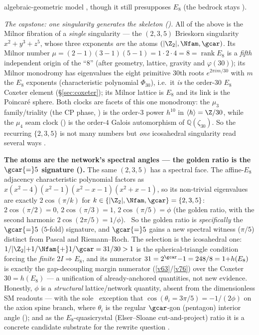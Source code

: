 \begin{keybox}
algebraic-geometric model \mC, though it still presupposes $E_8$ (the bedrock stays \mO).
\par\smallskip\noindent\emph{The capstone: one singularity generates the skeleton
().} All of the above is the Milnor fibration of a \emph{single}
singularity --- the $(2,3,5)$ Brieskorn singularity $x^2+y^3+z^5$, whose three exponents \emph{are} the atoms
$(|\Z_2|,\Nfam,\gcar)$. Its Milnor number $\mu=(2{-}1)(3{-}1)(5{-}1)=1{\cdot}2{\cdot}4=8=\operatorname{rank}E_8$
is a \emph{fifth} independent origin of the ``$8$'' (after geometry, lattice, gravity and $\varphi(30)$);
its Milnor monodromy has eigenvalues the eight primitive $30$th roots $e^{2\pi i m/30}$ with $m$ the $E_8$
exponents (characteristic polynomial $\Phi_{30}$), i.e.\ it \emph{is} the order-$30$ $E_8$ Coxeter element
(\S\ref{sec:coxeter}); its Milnor lattice is $E_8$ and its link is the Poincar\'e sphere. Both clocks are
facets of this one monodromy: the $\mu_3$ family/triality (the CP phase, )
is the order-$3$ power $h^{10}$ in $\langle h\rangle=\Z/30$, while the $\mu_4$ seam clock
() is the order-$4$ Galois automorphism of $\mathbb Q(\zeta_{30})$. So the
recurring $\{2,3,5\}$ is not many numbers but \emph{one} icosahedral singularity read several ways \mE.
\end{keybox}

\par\smallskip\noindent\textbf{The atoms are the network's spectral angles --- the golden ratio is the
$\gcar{=}5$ signature ().} The same $(2,3,5)$ has a spectral face. The
affine-$E_8$ adjacency characteristic polynomial factors as $x(x^2{-}4)(x^2{-}1)(x^2{-}x{-}1)(x^2{+}x{-}1)$, so its
non-trivial eigenvalues are exactly $2\cos(\pi/k)$ for $k\in\{|\Z_2|,\Nfam,\gcar\}=\{2,3,5\}$: $2\cos(\pi/2){=}0$,
$2\cos(\pi/3){=}1$, $2\cos(\pi/5){=}\phi$ (the golden ratio, with the second harmonic $2\cos(2\pi/5){=}1/\phi$).
\mE\ So the golden ratio is \emph{specifically} the $\gcar{=}5$ ($5$-fold) signature, and $\gcar{=}5$ gains a new
spectral witness ($\pi/5$) distinct from Pascal and Riemann--Roch. The selection is the icosahedral one:
$1/|\Z_2|{+}1/\Nfam{+}1/\gcar=31/30>1$ is the spherical-triangle condition forcing the \emph{finite}
$2I\Rightarrow E_8$, and its numerator $31=2^{\gcar}{-}1=248/8=1{+}h(E_8)$ is exactly the gap-decoupling margin
numerator (\vref{v63}/\vref{v76}) over the Coxeter $30=h(E_8)$ --- a unification of already-anchored quantities,
not new evidence. Honestly, $\phi$ is a \emph{structural} lattice/network quantity, absent from the dimensionless
SM readouts --- with the sole \mC\ exception that $\cos(\theta_i{=}3\pi/5)=-1/(2\phi)$ on the axion spine branch,
where $\theta_i$ is the regular $\gcar$-gon (pentagon) interior angle (); and
as the $E_8$-quasicrystal (Elser--Sloane cut-and-project) ratio it is a concrete candidate substrate
for the rewrite question \mC.

